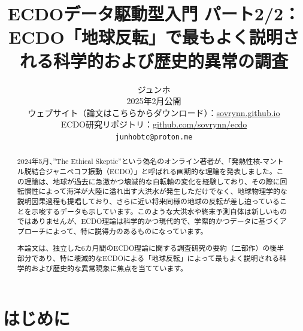 \documentclass[10pt,twocolumn,letterpaper]{article}
\begin{document}
\title{ECDOデータ駆動型入門 パート2/2：ECDO「地球反転」で最もよく説明される科学的および歴史的異常の調査}

\author{ジュンホ\\
2025年2月公開\\
ウェブサイト（論文はこちらからダウンロード）：\href{https://sovrynn.github.io}{sovrynn.github.io}\\
ECDO研究リポジトリ：\href{https://github.com/sovrynn/ecdo}{github.com/sovrynn/ecdo}\\
{\tt\small junhobtc@proton.me}
}

\maketitle

\begin{abstract}
2024年5月、”The Ethical Skeptic”という偽名のオンライン著者\cite{0}が、「発熱性核-マントル脱結合ジャニベコフ振動（ECDO）」\cite{1}と呼ばれる画期的な理論を発表しました。この理論は、地球が過去に急激かつ壊滅的な自転軸の変化を経験しており、その際に回転慣性によって海洋が大陸に溢れ出す大洪水が発生しただけでなく、地球物理学的な説明因果過程も提唱しており、さらに近い将来同様の地球の反転が差し迫っていることを示唆するデータも示しています。このような大洪水や終末予測自体は新しいものではありませんが、ECDO理論は科学的かつ現代的で、学際的かつデータに基づくアプローチによって、特に説得力のあるものになっています。

本論文は、独立した6カ月間のECDO理論に関する調査研究\cite{2,20}の要約（二部作）の後半部分であり、特に壊滅的なECDOによる「地球反転」によって最もよく説明される科学的および歴史的な異常現象に焦点を当てています。
\end{abstract}


\section{はじめに}
\end{document}
